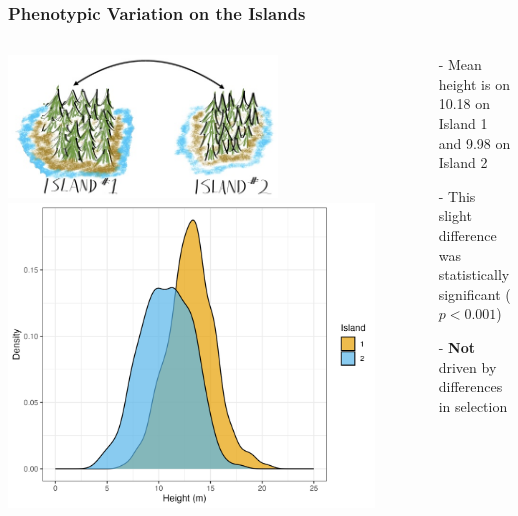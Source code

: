 \documentclass[xcolor=dvipsnames]{beamer}
\begin{document}
\begin{frame}
	\frametitle{Phenotypic Variation on the Islands}
	\begin{columns}
		\begin{column}{0.65\textwidth}
			\begin{itemize}
				\centering
		\includegraphics[keepaspectratio, width  = 0.7\textwidth]{img/treeIslands}
						\includegraphics[keepaspectratio, width  = 0.95\textwidth]{img/treePhens}				
			\end{itemize}
			
		\end{column}
		\begin{column}{0.4\textwidth}
			\begin{itemize}
				\item[-] Mean height is on 10.18 on Island 1 and 9.98 on Island 2  
				\item[-] This slight difference was statistically significant ($p<0.001$)
				\item[-] \textbf{Not} driven by differences in selection
			\end{itemize}
		\end{column}
	\end{columns}
 \end{frame}
 
\end{document}
